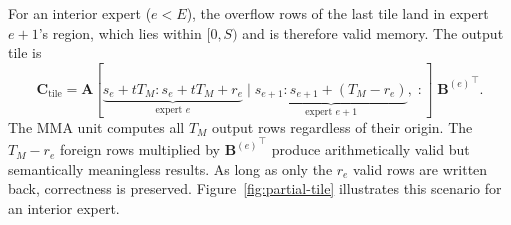 \documentclass[11pt,a4paper]{article}
\theoremstyle{definition}
\begin{document}
For an interior expert ($e < E$), the overflow rows of the last tile
land in expert~$e{+}1$'s region, which lies within $[0, S)$ and is
therefore valid memory. The output tile is
\begin{equation}
  \mathbf{C}_{\text{tile}} =
    \mathbf{A}[\underbrace{s_e{+}tT_M : s_e{+}tT_M{+}r_e}_{
      \text{expert } e}\;|\;
    \underbrace{s_{e+1} : s_{e+1}{+}(T_M{-}r_e)}_{
      \text{expert } e{+}1},\; :]\;
    {\mathbf{B}^{(e)}}^{\!\top}.
\label{eq:tile-matmul-interior}
\end{equation}
The MMA unit computes all $T_M$ output rows regardless of their
origin. The $T_M - r_e$ foreign rows multiplied by
${\mathbf{B}^{(e)}}^{\!\top}$ produce arithmetically valid but
semantically meaningless results. As long as only the $r_e$ valid rows
are written back, correctness is preserved.
Figure~\ref{fig:partial-tile} illustrates this scenario for an interior expert.
\end{document}
